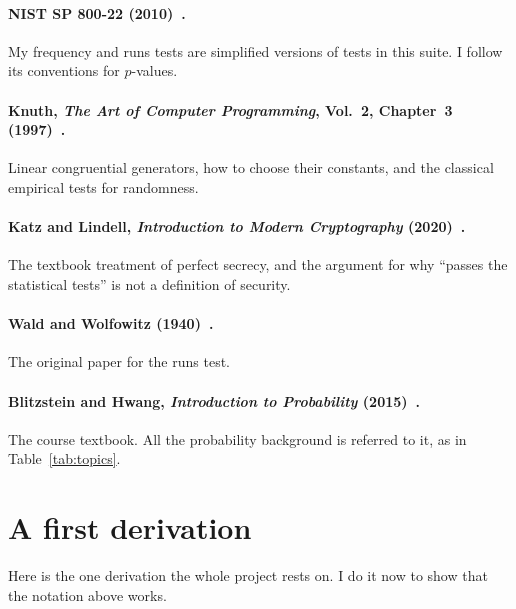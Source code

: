 \paragraph{NIST SP 800-22 (2010)~\cite{nistsp80022}.}
My frequency and runs tests are simplified versions of tests in this suite.
I follow its conventions for $p$-values.

\paragraph{Knuth, \emph{The Art of Computer Programming}, Vol.~2, Chapter~3
  (1997)~\cite{knuth1997}.}
Linear congruential generators, how to choose their constants, and the
classical empirical tests for randomness.

\paragraph{Katz and Lindell, \emph{Introduction to Modern Cryptography}
  (2020)~\cite{katz2020}.}
The textbook treatment of perfect secrecy, and the argument for why ``passes
the statistical tests'' is not a definition of security.

\paragraph{Wald and Wolfowitz (1940)~\cite{wald1940}.}
The original paper for the runs test.

\paragraph{Blitzstein and Hwang, \emph{Introduction to Probability}
  (2015)~\cite{blitzstein2015}.}
The course textbook. All the probability background is referred to it, as in
Table~\ref{tab:topics}.

\section{A first derivation}\label{sec:first-derivation}

Here is the one derivation the whole project rests on.  I do it now to
show that the notation above works.

